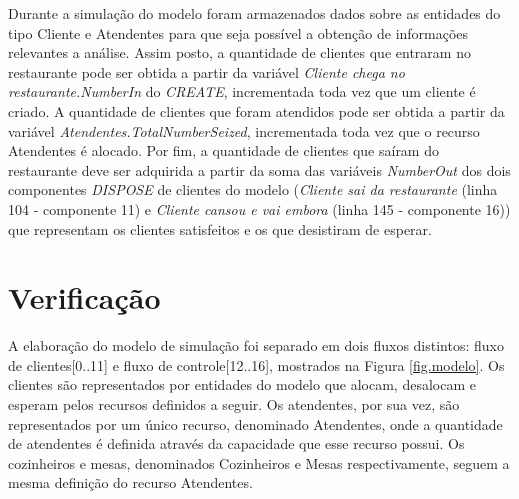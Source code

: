 \documentclass[pt,disc,oneside]{ufscpgeasthesis}
\begin{document}
			Durante a simulação do modelo foram armazenados dados sobre as entidades do tipo Cliente e Atendentes para que seja possível a obtenção de informações relevantes a análise.
			Assim posto, a quantidade de clientes que entraram no restaurante pode ser obtida a partir da variável \textit{Cliente chega no restaurante.NumberIn} do \textit{CREATE}, incrementada toda vez que um cliente é criado.
			A quantidade de clientes que foram atendidos pode ser obtida a partir da variável \textit{Atendentes.TotalNumberSeized}, incrementada toda vez que o recurso Atendentes é alocado.
			Por fim, a quantidade de clientes que saíram do restaurante deve ser adquirida a partir da soma das variáveis \textit{NumberOut} dos dois componentes \textit{DISPOSE} de clientes do modelo (\textit{Cliente sai da restaurante} (linha 104 - componente 11) e \textit{Cliente cansou e vai embora} (linha 145 - componente 16)) que representam os clientes satisfeitos e os que desistiram de esperar.

		\section{Verificação}
		\label{sec:verificacao}

			A elaboração do modelo de simulação foi separado em dois fluxos distintos: fluxo de clientes[0..11] e fluxo de controle[12..16], mostrados na Figura \ref{fig.modelo}.
			Os clientes são representados por entidades do modelo que alocam, desalocam e esperam pelos recursos definidos a seguir.
			Os atendentes, por sua vez, são representados por um único recurso, denominado Atendentes, onde a quantidade de atendentes é definida através da capacidade que esse recurso possui.
			Os cozinheiros e mesas, denominados Cozinheiros e Mesas respectivamente, seguem a mesma definição do recurso Atendentes.
\end{document}
